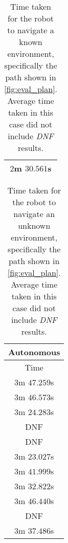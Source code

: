 \begin{appendices}
\begin{table}[!h]
\begin{tabular}{ c }
		\midrule
		$2$m $30.561$s \\
		\bottomrule
	\end{tabular}
	\caption{Time taken for the robot to navigate a known environment, specifically the path shown in \autoref{fig:eval_plan}. Average time taken in this case did not include \emph{DNF} results.}
	\label{tab:eval_nav_cp_known}
\end{table}

\begin{table}[!h]
	\centering
	\begin{tabular}{ c }
		\toprule
		\textbf{Autonomous} \\
		\midrule
		Time \\
		\midrule
		$3$m $47.259$s \\

		$3$m $46.573$s \\

		$3$m $24.283$s \\

		DNF \\

		DNF \\

		$3$m $23.027$s \\

		$3$m $41.999$s \\

		$3$m $32.822$s \\

		$3$m $46.440$s \\

		DNF \\

		\midrule
		$3$m $37.486$s \\
		\bottomrule
	\end{tabular}
	\caption{Time taken for the robot to navigate an unknown environment, specifically the path shown in \autoref{fig:eval_plan}. Average time taken in this case did not include \emph{DNF} results.}
	\label{tab:eval_nav_cp_unknown}
\end{table}

\end{appendices}
